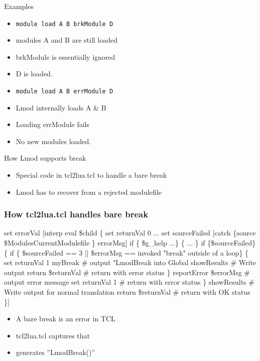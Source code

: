 \documentclass{beamer}
\begin{document}
\begin{frame}{Examples}
  \begin{itemize}
    \item \texttt{module load A B brkModule D}
    \item modules A and B are still loaded 
    \item brkModule is essentially ignored
    \item D is loaded.
    \item \texttt{module load A B errModule D}
    \item Lmod internally loads A \& B
    \item Loading errModule fails
    \item No new modules loaded.
  \end{itemize}
\end{frame}

\begin{frame}{How Lmod supports break}
  \begin{itemize}
    \item Special code in tcl2lua.tcl to handle a bare break
    \item Lmod has to recover from a rejected modulefile
  \end{itemize}
\end{frame}



\begin{frame}[fragile]
    \frametitle{How tcl2lua.tcl handles bare break}
 {\tiny
    \begin{semiverbatim}
 set errorVal [interp eval \$child \{
     set returnVal 0
     ...
     set sourceFailed [catch \{source \$ModulesCurrentModulefile \} errorMsg]
     if \{ \$g\_help ...\} \{
       ...
     \}
     if \{\$sourceFailed\} \{
        if \{ \$sourceFailed == 3 || \$errorMsg == {invoked "break" outside of a loop}\} \{
           set returnVal 1
           myBreak             # output "LmodBreak into Global 
           showResults         # Write output
           return \$returnVal   # return with error status
        \}
        reportError \$errorMsg   # output error message
        set returnVal 1         # return with error status
     \}
     showResults                 # Write output for normal translation
     return \$returnVal           # return with OK status
 \}]
    \end{semiverbatim}
}
  \begin{itemize}
    \item A bare break is an error in TCL
    \item tcl2lua.tcl captures that
    \item generates ''LmodBreak()''
  \end{itemize}

\end{frame}
\end{document}
